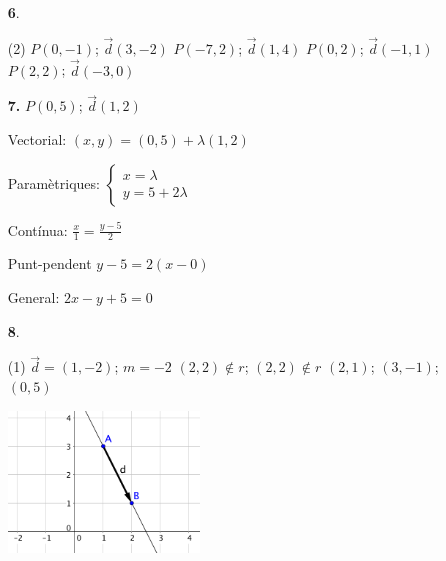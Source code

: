 \documentclass[a4paper, pdf, twoside]{book}
\begin{document}
\begin{multicols}{2}
\begin{enumerate}

 \item[\fontfamily{phv}\selectfont\color{blue}\textbf{6}. ] 
 \begin{tasks}[column-sep=1em, item-indent=1.3333em](2)
	 \task $P(0,-1)$; $\vec d(3,-2)$
	 \task $P(-7,2)$; $\vec d(1,4)$
	 \task $P(0,2)$; $\vec d(-1,1)$
	 \task $P(2,2)$; $\vec d(-3,0)$
\end{tasks}
\vspace{0.25cm}
\item[\fontfamily{phv}\selectfont\color{blue}\textbf{7. }] 
$P(0,5)$; $\vec d(1,2)$\par Vectorial: $(x,y)=(0,5)+\lambda (1,2)$ \par Paramètriques: $\left \{ \begin {array}{l} x=\lambda \\ y=5+2\lambda \end {array} \right .$ \par Contínua: $\frac {x}{1}=\frac {y-5}{2}$ \par Punt-pendent $y-5 = 2 (x-0)$ \par General: $2x-y+5=0$ 
\vspace{0.25cm}



 \item[\fontfamily{phv}\selectfont\color{blue}\textbf{8}. ] 
 \begin{tasks}[column-sep=1em, item-indent=1.3333em](1)
	 \task $\vec d=(1,-2)$; $m=-2$
	 \task* $(2,2) \notin r$; $(2,2) \notin r$
	 \task $(2,1)$; $(3,-1)$; $(0,5)$
	 \task* \mbox {}\par \includegraphics [width=0.4\textwidth ]{img-sol/t9-8d} 
\end{tasks}
 \end{enumerate}
\vspace{0.3cm}



\end{multicols}
\end{document}
